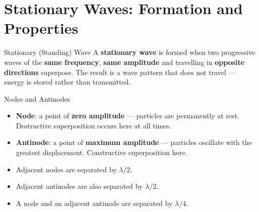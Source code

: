 

\pagebreak

\section{Stationary Waves: Formation and Properties}

\begin{definitionbox}{Stationary (Standing) Wave}
A \textbf{stationary wave} is formed when two progressive waves of the \textbf{same frequency}, \textbf{same amplitude} and travelling in \textbf{opposite directions} superpose. The result is a wave pattern that does not travel — energy is stored rather than transmitted.
\end{definitionbox}

\begin{definitionbox}{Nodes and Antinodes}
\begin{itemize}[itemsep=2pt]
  \item \textbf{Node}: a point of \textbf{zero amplitude} — particles are permanently at rest. Destructive superposition occurs here at all times.
  \item \textbf{Antinode}: a point of \textbf{maximum amplitude} — particles oscillate with the greatest displacement. Constructive superposition here.
  \item Adjacent nodes are separated by $\lambda/2$.
  \item Adjacent antinodes are also separated by $\lambda/2$.
  \item A node and an adjacent antinode are separated by $\lambda/4$.
\end{itemize}
\end{definitionbox}

